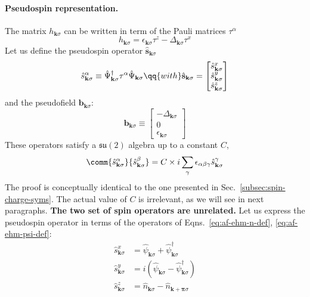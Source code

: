 \paragraph{Pseudospin representation.} The matrix $h_{\mathbf{k}\sigma}$ can be written in term of the Pauli matrices $\tau^\alpha$ 
\[
	h_{\mathbf{k}\sigma} = \epsilon_{\mathbf{k}\sigma} \tau^z - \Delta_{\mathbf{k}\sigma} \tau^x
\]
Let us define the pseudospin operator $\hat{\mathbf{s}}_{\mathbf{k}\sigma}$
\begin{equation}\label{eq:af-pseudospin-def}
	\hat s_{\mathbf{k}\sigma}^\alpha \equiv \hat \Psi_{\mathbf{k}\sigma}^\dagger \tau^\alpha \hat \Psi_{\mathbf{k}\sigma}
	\qq{with}
	\hat{\mathbf{s}}_{\mathbf{k}\sigma} = \begin{bmatrix}
		\hat s_{\mathbf{k}\sigma}^x \\
		\hat s_{\mathbf{k}\sigma}^y \\
		\hat s_{\mathbf{k}\sigma}^z
	\end{bmatrix}
\end{equation}
and the pseudofield $\mathbf{b}_{\mathbf{k}\sigma}$:
\[
	\mathbf{b}_{\mathbf{k}\sigma} \equiv \begin{bmatrix}
		-\Delta_{\mathbf{k}\sigma} \\ 0 \\ \epsilon_{\mathbf{k}\sigma} 
	\end{bmatrix}
\]
These operators satisfy a $\mathfrak{su}(2)$ algebra up to a constant $C$,
\begin{equation}\label{eq:af-almost-su2}
	\comm{\hat s_{\mathbf{k}\sigma}^\alpha}{\hat s_{\mathbf{k}\sigma}^\beta} = C \times i\sum_\gamma \epsilon_{\alpha\beta\gamma} \hat s_{\mathbf{k}\sigma}^\gamma
\end{equation}
The proof is conceptually identical to the one presented in Sec.~\ref{subsec:spin-charge-syms}. The actual value of $C$ is irrelevant, as we will see in next paragraphs. {\color{tabred}\textbf{The two set of spin operators are unrelated.}} Let us express the pseudospin operator in terms of the operators of Eqns.~\eqref{eq:af-ehm-n-def}, \eqref{eq:af-ehm-psi-def}:
\begin{align}
	\hat s_{\mathbf{k}\sigma}^x &= \hat \psi_{\mathbf{k}\sigma} + \hat \psi_{\mathbf{k}\sigma}^\dagger \label{eq:af-hm-x-psi} \\
	\hat s_{\mathbf{k}\sigma}^y &= i \left(
	\hat \psi_{\mathbf{k}\sigma} - \hat \psi_{\mathbf{k}\sigma}^\dagger 
	\right) \label{eq:af-hm-y-psi} \\
	\hat s_{\mathbf{k}\sigma}^z &= \hat n_{\mathbf{k}\sigma} - \hat n_{\mathbf{k}+\bm{\pi}\sigma} \label{eq:af-hm-z-psi} 
\end{align}
